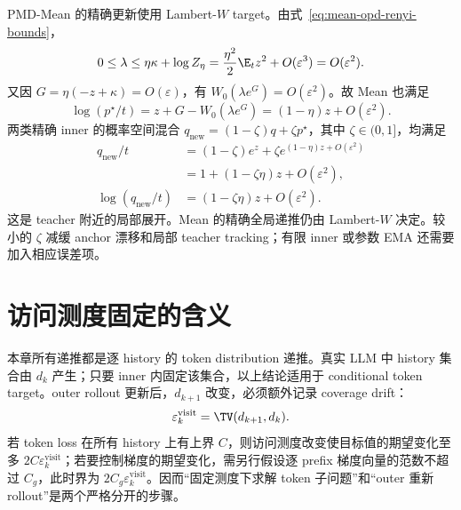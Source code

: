 PMD-Mean 的精确更新使用 Lambert-$W$ target。由式~\eqref{eq:mean-opd-renyi-bounds}，
\[
0\le\lambda\le\eta\kappa+\log Z_\eta
=\frac{\eta^2}2\E_tz^2+O(\varepsilon^3)=O(\varepsilon^2).
\]
又因 $G=\eta(-z+\kappa)=O(\varepsilon)$，有
$W_0(\lambda e^G)=O(\varepsilon^2)$。故 Mean 也满足
\[
\log(p^\star/t)=z+G-W_0(\lambda e^G)
=(1-\eta)z+O(\varepsilon^2).
\]
两类精确 inner 的概率空间混合 $q_{\mathrm{new}}=(1-\zeta)q+\zeta p^\star$，其中 $\zeta\in(0,1]$，均满足
\begin{align*}
q_{\mathrm{new}}/t
&=(1-\zeta)e^z+\zeta e^{(1-\eta)z+O(\varepsilon^2)}\\
&=1+(1-\zeta\eta)z+O(\varepsilon^2),\\
\log(q_{\mathrm{new}}/t)
&=(1-\zeta\eta)z+O(\varepsilon^2).
\end{align*}
这是 teacher 附近的局部展开。Mean 的精确全局递推仍由 Lambert-$W$ 决定。较小的 $\zeta$ 减缓 anchor 漂移和局部 teacher tracking；有限 inner 或参数 EMA 还需要加入相应误差项。

\section{访问测度固定的含义}

本章所有递推都是逐 history 的 token distribution 递推。真实 LLM 中 history 集合由 $d_k$ 产生；只要 inner 内固定该集合，以上结论适用于 conditional token target。outer rollout 更新后，$d_{k+1}$ 改变，必须额外记录 coverage drift：
\[
 \varepsilon_k^{\mathrm{visit}}=\TV(d_{k+1},d_k).
\]
若 token loss 在所有 history 上有上界 $C$，则访问测度改变使目标值的期望变化至多 $2C\varepsilon_k^{\mathrm{visit}}$；若要控制梯度的期望变化，需另行假设逐 prefix 梯度向量的范数不超过 $C_g$，此时界为 $2C_g\varepsilon_k^{\mathrm{visit}}$。因而“固定测度下求解 token 子问题”和“outer 重新 rollout”是两个严格分开的步骤。


